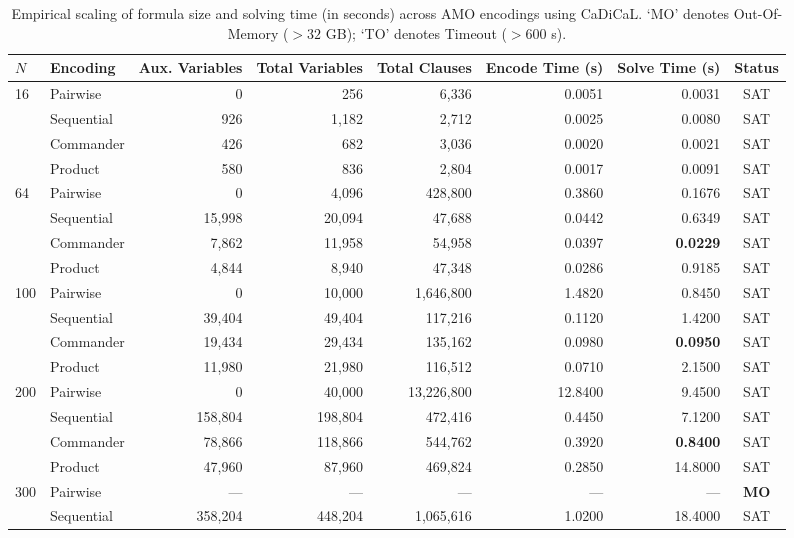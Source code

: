 \documentclass[a4paper,fleqn]{cas-sc}
\begin{document}
\begin{table}[!htbp]
\centering
\caption{Empirical scaling of formula size and solving time (in seconds) across AMO encodings using CaDiCaL. `MO' denotes Out-Of-Memory ($> 32$ GB); `TO' denotes Timeout ($> 600$ s).}
\label{tab:e1_scaling}
\small
\begin{tabular*}{\textwidth}{llrrrrrc}
\toprule
$N$ & \textbf{Encoding} & \textbf{Aux. Variables} & \textbf{Total Variables} & \textbf{Total Clauses} & \textbf{Encode Time (s)} & \textbf{Solve Time (s)} & \textbf{Status} \\
\midrule
\multirow{4}{*}{16} 
 & Pairwise & 0 & 256 & 6,336 & 0.0051 & 0.0031 & SAT \\
 & Sequential & 926 & 1,182 & 2,712 & 0.0025 & 0.0080 & SAT \\
 & Commander & 426 & 682 & 3,036 & 0.0020 & 0.0021 & SAT \\
 & Product & 580 & 836 & 2,804 & 0.0017 & 0.0091 & SAT \\
\midrule
\multirow{4}{*}{64} 
 & Pairwise & 0 & 4,096 & 428,800 & 0.3860 & 0.1676 & SAT \\
 & Sequential & 15,998 & 20,094 & 47,688 & 0.0442 & 0.6349 & SAT \\
 & Commander & 7,862 & 11,958 & 54,958 & 0.0397 & \textbf{0.0229} & SAT \\
 & Product & 4,844 & 8,940 & 47,348 & 0.0286 & 0.9185 & SAT \\
\midrule
\multirow{4}{*}{100} 
 & Pairwise & 0 & 10,000 & 1,646,800 & 1.4820 & 0.8450 & SAT \\
 & Sequential & 39,404 & 49,404 & 117,216 & 0.1120 & 1.4200 & SAT \\
 & Commander & 19,434 & 29,434 & 135,162 & 0.0980 & \textbf{0.0950} & SAT \\
 & Product & 11,980 & 21,980 & 116,512 & 0.0710 & 2.1500 & SAT \\
\midrule
\multirow{4}{*}{200} 
 & Pairwise & 0 & 40,000 & 13,226,800 & 12.8400 & 9.4500 & SAT \\
 & Sequential & 158,804 & 198,804 & 472,416 & 0.4450 & 7.1200 & SAT \\
 & Commander & 78,866 & 118,866 & 544,762 & 0.3920 & \textbf{0.8400} & SAT \\
 & Product & 47,960 & 87,960 & 469,824 & 0.2850 & 14.8000 & SAT \\
\midrule
\multirow{4}{*}{300} 
 & Pairwise & --- & --- & --- & --- & --- & \textbf{MO} \\
 & Sequential & 358,204 & 448,204 & 1,065,616 & 1.0200 & 18.4000 & SAT \\

\end{tabular*}
\end{table}
\end{document}
